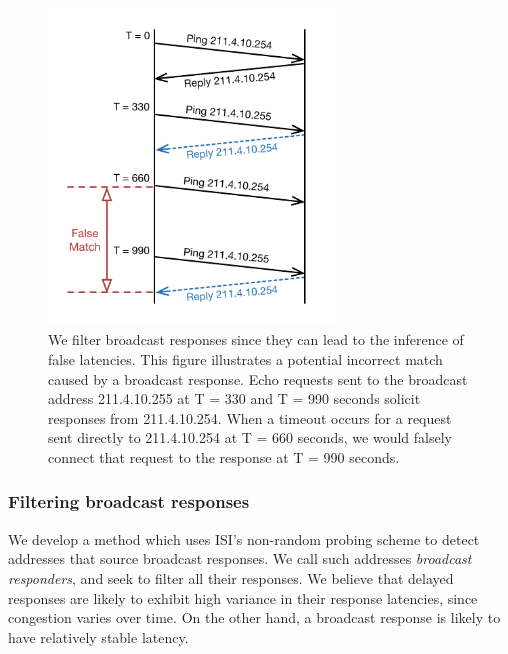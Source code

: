 \begin{figure}[t]
\begin{center}
\includegraphics[width=3in]{timeouts/figs/wfall_bcast}
\end{center}
\caption[Potential incorrect match caused by a broadcast response]{\label{fig:bcast_sample}%
We filter broadcast responses since they can lead to the inference of
false latencies. This figure illustrates a potential incorrect match
caused by a broadcast response.
Echo requests sent to the broadcast address 211.4.10.255 at T = 330
and T = 990 seconds solicit responses from 211.4.10.254.  When a timeout occurs 
for a request sent directly to 211.4.10.254 at T = 660 seconds, we 
would falsely connect that request to the response at T = 990 seconds.}
\end{figure}

%

\subsubsection*{Filtering broadcast responses}

%
We develop a method which uses ISI's non-random probing
scheme to detect addresses that source broadcast responses.
We call such addresses \emph{broadcast responders}, and seek to filter
all their responses.
%
We believe that delayed responses are likely to
exhibit high variance in their response latencies, since congestion varies over
time. 
%
On the other hand, a
broadcast response is likely to have relatively stable latency.
%

